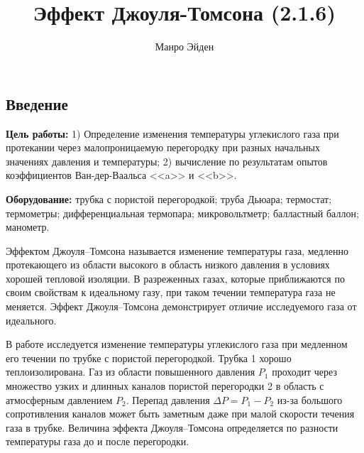 \documentclass[a4paper, 12pt]{article}
\title{\textbf{Эффект Джоуля-Томсона (2.1.6)}}
\author{Манро Эйден}
\date{}
\begin{document}
\maketitle

\begin{center}
    \section*{Введение}
\end{center}

\noindent \textbf{Цель работы:} 1) Определение изменения температуры углекислого газа при протекании через малопроницаемую перегородку при разных начальных значениях давления и температуры; 2) вычисление по результатам опытов коэффициентов Ван-дер-Ваальса <<a>> и <<b>>.

\bigskip

\noindent \textbf{Оборудование:} трубка с пористой перегородкой; труба Дьюара; термостат; термометры; дифференциальная термопара; микровольтметр; балластный баллон; манометр.

\bigskip

Эффектом Джоуля–Томсона называется изменение температуры газа, медленно протекающего из области высокого в область низкого давления в условиях хорошей тепловой изоляции. В разреженных газах, которые приближаются по своим свойствам к идеальному газу, при таком течении температура газа не меняется. Эффект Джоуля–Томсона демонстрирует отличие исследуемого газа от идеального.
	
	В работе исследуется изменение температуры углекислого газа при медленном его течении по трубке с пористой перегородкой. Трубка 1 хорошо теплоизолирована. Газ из области повышенного давления $P_1$ проходит через множество узких и длинных каналов пористой перегородки 2 в область с атмосферным давлением $P_2$. Перепад давления  $\Delta P = P_1 - P_2$ из-за большого сопротивления каналов может быть заметным даже при малой скорости течения газа в трубке. Величина эффекта Джоуля–Томсона определяется по разности температуры газа до и после перегородки.
	
\end{document}

